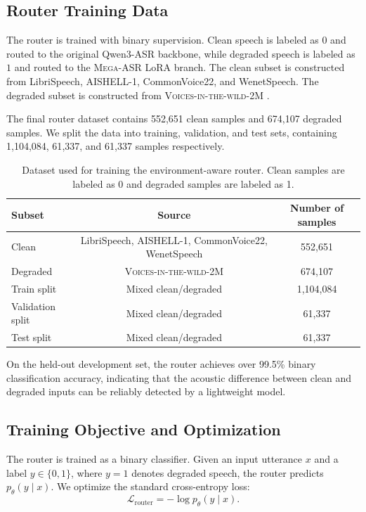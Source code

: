 \documentclass{article}
\begin{document}
\subsection{Router Training Data}

The router is trained with binary supervision. Clean speech is labeled as
$0$ and routed to the original Qwen3-ASR backbone, while degraded speech is
labeled as $1$ and routed to the \textsc{Mega-ASR} LoRA branch. The clean subset is
constructed from LibriSpeech, AISHELL-1, CommonVoice22, and WenetSpeech. The
degraded subset is constructed from  \textsc{Voices-in-the-wild-2M} .

The final router dataset contains 552{,}651 clean samples and 674{,}107 degraded
samples. We split the data into training, validation, and test sets, containing
1{,}104{,}084, 61{,}337, and 61{,}337 samples respectively.

\begin{table}[t]
\centering
\small
\caption{Dataset used for training the environment-aware router. Clean samples are labeled as 0 and degraded samples are labeled as 1.}
\label{tab:router_dataset}
\begin{tabular}{lcc}
\toprule
\textbf{Subset} & \textbf{Source} & \textbf{Number of samples} \\
\midrule
Clean & LibriSpeech, AISHELL-1, CommonVoice22, WenetSpeech & 552{,}651 \\
Degraded &  \textsc{Voices-in-the-wild-2M}  & 674{,}107 \\
\midrule
Train split & Mixed clean/degraded & 1{,}104{,}084 \\
Validation split & Mixed clean/degraded & 61{,}337 \\
Test split & Mixed clean/degraded & 61{,}337 \\
\bottomrule
\end{tabular}
\end{table}

On the held-out development set, the router achieves over 99.5\% binary
classification accuracy, indicating that the acoustic difference between clean
and degraded inputs can be reliably detected by a lightweight model.

\subsection{Training Objective and Optimization}

The router is trained as a binary classifier. Given an input utterance $x$ and
a label $y\in\{0,1\}$, where $y=1$ denotes degraded speech, the router predicts
$p_\theta(y\mid x)$. We optimize the standard cross-entropy loss:
\[
\mathcal{L}_{\mathrm{router}}
=
-\log p_\theta(y\mid x).
\]
\end{document}
